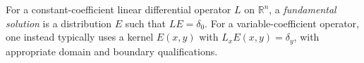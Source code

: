 
For a constant-coefficient linear differential operator $L$ on $\mathbb R^n$, a \emph{fundamental solution} is a distribution $E$ such that $LE=\delta_0$. For a variable-coefficient operator, one instead typically uses a kernel $E(x,y)$ with $L_xE(x,y)=\delta_y$, with appropriate domain and boundary qualifications.

